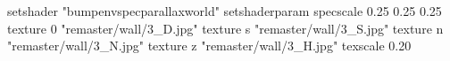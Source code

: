 setshader "bumpenvspecparallaxworld"
setshaderparam specscale 0.25 0.25 0.25
    texture 0 "remaster/wall/3_D.jpg"
    texture s "remaster/wall/3_S.jpg"
    texture n "remaster/wall/3_N.jpg"
    texture z "remaster/wall/3_H.jpg"
    texscale 0.20